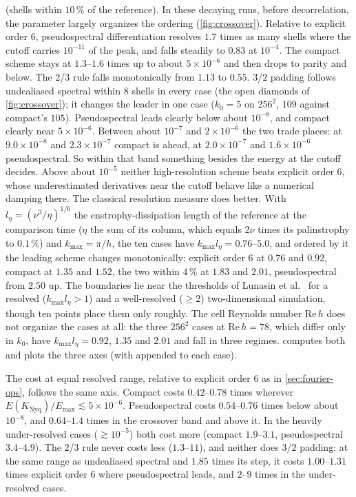 \documentclass[11pt,a4paper]{article}
\newcommand{\Rey}{\mathrm{Re}}
\newcommand{\code}[1]{\texttt{\detokenize{#1}}}
\begin{document}
(shells within $10\,\%$ of the reference).  In these decaying runs, before decorrelation, the parameter largely organizes the ordering (\cref{fig:crossover}).  Relative to explicit order 6, pseudospectral differentiation resolves $1.7$ times as many shells where the cutoff carries $10^{-11}$ of the peak, and falls steadily to $0.83$ at $10^{-4}$.  The compact scheme stays at $1.3$--$1.6$ times up to about $5\times10^{-6}$ and then drops to parity and below.  The 2/3 rule falls monotonically from $1.13$ to $0.55$.  $3/2$ padding follows undealiased spectral within $8$ shells in every case (the open diamonds of \cref{fig:crossover}); it changes the leader in one case ($k_0=5$ on $256^2$, $109$ against compact's $105$).  Pseudospectral leads clearly below about $10^{-8}$, and compact clearly near $5\times10^{-6}$.  Between about $10^{-7}$ and $2\times10^{-6}$ the two trade places: at $9.0\times10^{-8}$ and $2.3\times10^{-7}$ compact is ahead, at $2.0\times10^{-7}$ and $1.6\times10^{-6}$ pseudospectral.  So within that band something besides the energy at the cutoff decides.  Above about $10^{-5}$ neither high-resolution scheme beats explicit order 6, whose underestimated derivatives near the cutoff behave like a numerical damping there.  The classical resolution measure does better.  With $l_\eta=(\nu^3/\eta)^{1/6}$ the enstrophy-dissipation length of the reference at the comparison time ($\eta$ the sum of its \code{D_Z} column, which equals $2\nu$ times its palinstrophy to $0.1\,\%$) and $k_{\max}=\pi/h$, the ten cases have $k_{\max}l_\eta=0.76$--$5.0$, and ordered by it the leading scheme changes monotonically: explicit order 6 at $0.76$ and $0.92$, compact at $1.35$ and $1.52$, the two within $4\,\%$ at $1.83$ and $2.01$, pseudospectral from $2.50$ up.  The boundaries lie near the thresholds of Lunasin et al.~\cite{lunasin2007} for a resolved ($k_{\max}l_\eta>1$) and a well-resolved ($\ge2$) two-dimensional simulation, though ten points place them only roughly.  The cell Reynolds number $\Rey\,h$ does not organize the cases at all: the three $256^2$ cases at $\Rey\,h=78$, which differ only in $k_0$, have $k_{\max}l_\eta=0.92$, $1.35$ and $2.01$ and fall in three regimes.  \code{tools/compare_schemes.py crossover} computes both and plots the three axes (with \code{:RE} appended to each case).

The cost at equal resolved range, relative to explicit order 6 as in \cref{sec:fourier-ops}, follows the same axis.  Compact costs $0.42$--$0.78$ times wherever $E(K_{\mathrm{Nyq}})/E_{\max}\lesssim5\times10^{-6}$.  Pseudospectral costs $0.54$--$0.76$ times below about $10^{-8}$, and $0.64$--$1.4$ times in the crossover band and above it.  In the heavily under-resolved cases ($\gtrsim10^{-5}$) both cost more (compact $1.9$--$3.1$, pseudospectral $3.4$--$4.9$).  The 2/3 rule never costs less ($1.3$--$11$), and neither does $3/2$ padding: at the same range as undealiased spectral and $1.85$ times its step, it costs $1.00$--$1.31$ times explicit order 6 where pseudospectral leads, and $2$--$9$ times in the under-resolved cases.
\end{document}
